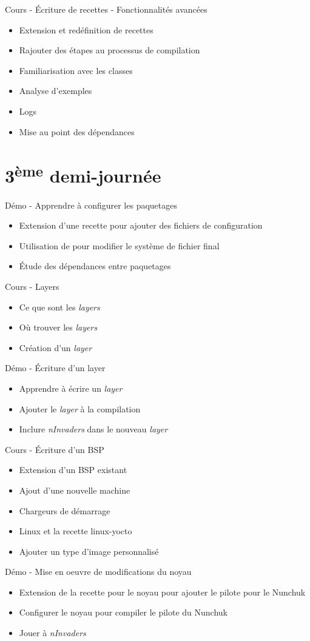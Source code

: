 \documentclass[a4paper,12pt,obeyspaces,spaces,hyphens]{article}
\begin{document}
\feagendaonecolumn
{Cours - Écriture de recettes - Fonctionnalités avancées}
{
  \begin{itemize}
  \item Extension et redéfinition de recettes
  \item Rajouter des étapes au processus de compilation
  \item Familiarisation avec les classes
  \item Analyse d'exemples
  \item Logs
  \item Mise au point des dépendances
  \end{itemize}
}

\section{3\textsuperscript{ème} demi-journée}

\feagendaonecolumn
{Démo - Apprendre à configurer les paquetages}
{
  \begin{itemize}
  \item Extension d'une recette pour ajouter des fichiers de configuration
  \item Utilisation de  pour modifier
        le système de fichier final
  \item Étude des dépendances entre paquetages
  \end{itemize}
}
\feagendatwocolumn
{Cours - Layers}
{
  \begin{itemize}
  \item Ce que sont les {\em layers}
  \item Où trouver les {\em layers}
  \item Création d'un {\em layer}
  \end{itemize}
}
{Démo - Écriture d'un layer}
{
  \begin{itemize}
  \item Apprendre à écrire un {\em layer}
  \item Ajouter le {\em layer} à la compilation
  \item Inclure {\em nInvaders} dans le nouveau {\em layer}
  \end{itemize}
}

\feagendatwocolumn
{Cours - Écriture d'un BSP}
{
  \begin{itemize}
  \item Extension d'un BSP existant
  \item Ajout d'une nouvelle machine
  \item Chargeurs de démarrage
  \item Linux et la recette linux-yocto
  \item Ajouter un type d'image personnalisé
  \end{itemize}
}
{Démo - Mise en oeuvre de modifications du noyau}
{
  \begin{itemize}
  \item Extension de la recette pour le noyau pour ajouter le pilote
        pour le Nunchuk
  \item Configurer le noyau pour compiler le pilote du Nunchuk
  \item Jouer à {\em nInvaders}
  \end{itemize}
}
\end{document}
